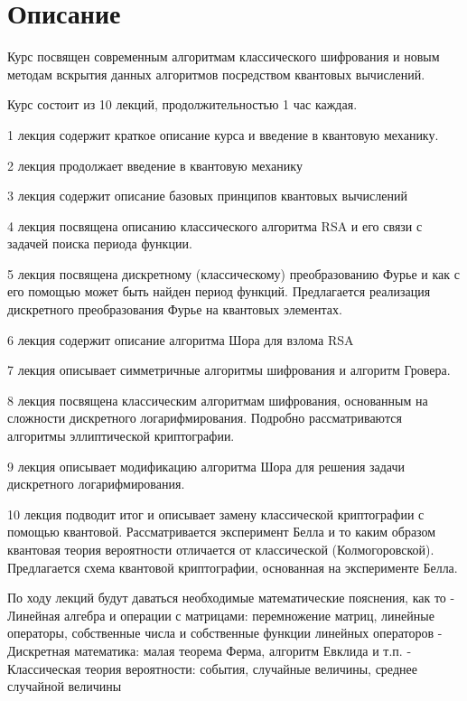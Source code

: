 \section{Описание}
Курс посвящен современным алгоритмам классического шифрования и новым
методам вскрытия данных алгоритмов посредством квантовых вычислений. 

Курс состоит из 10 лекций, продолжительностью 1 час каждая.

1 лекция содержит краткое описание курса и введение в квантовую
механику. 

2 лекция продолжает введение в квантовую механику

3 лекция содержит описание базовых принципов квантовых вычислений

4 лекция посвящена описанию классического алгоритма RSA и его связи с
задачей поиска периода функции.

5 лекция посвящена дискретному (классическому) преобразованию Фурье и
как с его помощью может быть найден период функций. Предлагается
реализация дискретного преобразования Фурье на квантовых элементах.

6 лекция содержит описание алгоритма Шора для взлома RSA

7 лекция описывает симметричные алгоритмы шифрования и алгоритм
Гровера.

8 лекция посвящена классическим алгоритмам шифрования, основанным на
сложности дискретного логарифмирования. Подробно рассматриваются
алгоритмы эллиптической криптографии.

9 лекция описывает модификацию алгоритма Шора для решения задачи
дискретного логарифмирования.

10 лекция подводит итог и описывает замену классической криптографии с
помощью квантовой. Рассматривается эксперимент Белла и то каким образом
квантовая теория вероятности отличается от классической
(Колмогоровской). Предлагается схема квантовой криптографии,
основанная на эксперименте Белла.

По ходу лекций будут даваться необходимые математические пояснения, как
то
- Линейная алгебра и операции с матрицами: перемножение матриц,
линейные операторы, собственные числа и собственные функции линейных
операторов
- Дискретная математика: малая теорема Ферма, алгоритм
Евклида и т.п.
- Классическая теория вероятности: события, случайные величины,
среднее случайной величины
